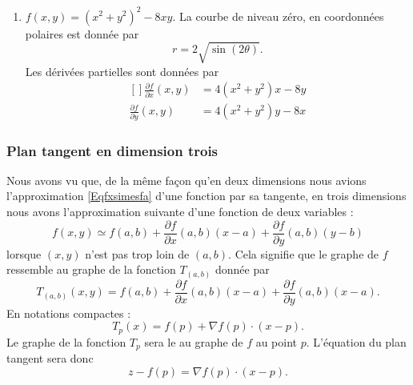 \begin{example}
\begin{enumerate}
\item
$f(x,y)=(x^2+y^2)^2-8xy$. La courbe de niveau zéro, en coordonnées polaires est donnée par
\begin{equation}
	r=2\sqrt{\sin(2\theta)}.
\end{equation}
Les dérivées partielles sont données par
\begin{equation}
	\begin{aligned}[]
		\frac{ \partial f }{ \partial x }(x,y)	&=4(x^2+y^2)x-8y\\
		\frac{ \partial f }{ \partial y }(x,y)	&=4(x^2+y^2)y-8x
	\end{aligned}
\end{equation}

\end{enumerate}
\end{example}

\subsubsection{Plan tangent en dimension trois}

Nous avons vu que, de la même façon qu'en deux dimensions nous avions l'approximation \eqref{Eqfxsimesfa} d'une fonction par sa tangente, en trois dimensions nous avons l'approximation suivante d'une fonction de deux variables :
\begin{equation}
	f(x,y)\simeq f(a,b)+\frac{ \partial f }{ \partial x }(a,b)(x-a)+\frac{ \partial f }{ \partial y }(a,b)(y-b)
\end{equation}
lorsque \( (x,y)\) n'est pas trop loin de \( (a,b)\). Cela signifie que le graphe de \( f\) ressemble au graphe de la fonction \( T_{(a,b)}\) donnée par
\begin{equation}
	T_{(a,b)}(x,y)=f(a,b)+\frac{ \partial f }{ \partial x }(a,b)(x-a)+\frac{ \partial f }{ \partial y }(a,b)(x-a).
\end{equation}
En notations compactes :
\begin{equation}
	T_p(x)=f(p)+\nabla f(p)\cdot (x-p).
\end{equation}
Le graphe de la fonction \( T_p\) sera le  au graphe de \( f\) au point \( p\). L'équation du plan tangent sera donc
\begin{equation}
	z-f(p)=\nabla f(p)\cdot (x-p).
\end{equation}

